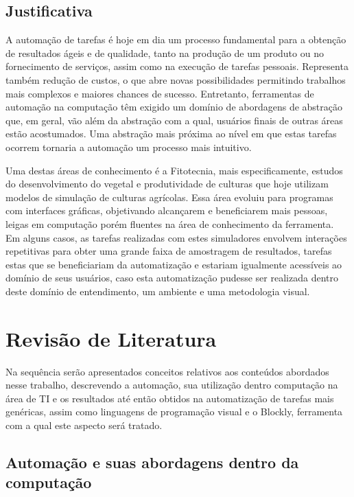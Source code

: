 \documentclass[tg]{mdtufsm}
\begin{document}
    	\section{Justificativa}

            A automação de tarefas é hoje em dia um processo fundamental para a obtenção de resultados ágeis e de qualidade, tanto na produção de um produto ou no fornecimento de serviços, assim como na execução de tarefas pessoais. Representa também redução de custos, o que abre novas possibilidades permitindo trabalhos mais complexos e maiores chances de sucesso. Entretanto, ferramentas de automação na computação têm exigido um domínio de abordagens de abstração que, em geral, vão além da abstração com a qual, usuários finais de outras áreas estão acostumados. Uma abstração mais próxima ao nível em que estas tarefas ocorrem tornaria a automação um processo mais intuitivo.

        	Uma destas áreas de conhecimento é a Fitotecnia, mais especificamente, estudos do desenvolvimento do vegetal e produtividade de culturas que hoje utilizam modelos de simulação de culturas agrícolas. Essa área evoluiu para programas com interfaces gráficas, objetivando alcançarem e beneficiarem mais pessoas, leigas em computação porém fluentes na área de conhecimento da ferramenta. Em alguns casos, as tarefas realizadas com estes simuladores envolvem interações repetitivas para obter uma grande faixa de amostragem de resultados, tarefas estas que se beneficiariam da automatização e estariam igualmente acessíveis ao domínio de seus usuários, caso esta automatização pudesse ser realizada dentro deste domínio de entendimento, um ambiente e uma metodologia visual.

	\chapter{Revisão de Literatura}
    	Na sequência serão apresentados conceitos relativos aos conteúdos abordados nesse trabalho, descrevendo a automação, sua utilização dentro computação na área de TI e os resultados até então obtidos na automatização de tarefas mais genéricas, assim como linguagens de programação visual e o Blockly, ferramenta com a qual este aspecto será tratado.

    	\section{Automação e suas abordagens dentro da computação}
\end{document}
